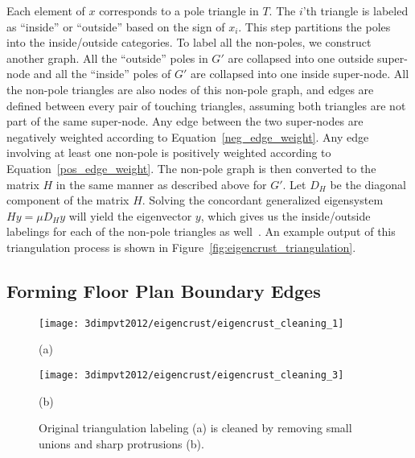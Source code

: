 \documentclass[12pt,onecolumn,oneside]{book}
\begin{document}
Each element of $x$ corresponds to a pole triangle in $T$.  The $i$'th triangle is labeled as ``inside'' or ``outside'' based on the sign of $x_i$.  This step partitions the poles into the inside/outside categories.  To label all the non-poles, we construct another graph.  All the ``outside'' poles in $G'$ are collapsed into one outside super-node and all the ``inside'' poles of $G'$ are collapsed into one inside super-node.  All the non-pole triangles are also nodes of this non-pole graph, and edges are defined between every pair of touching triangles, assuming both triangles are not part of the same super-node. Any edge between the two super-nodes are negatively weighted according to Equation~\ref{neg_edge_weight}.  Any edge involving at least one non-pole is positively weighted according to Equation~\ref{pos_edge_weight}.  The non-pole graph is then converted to the matrix $H$ in the same manner as described above for $G'$.  Let $D_H$ be the diagonal component of the matrix $H$.  Solving the concordant generalized eigensystem $H y = \mu D_H y$ will yield the eigenvector $y$, which gives us the inside/outside labelings for each of the non-pole triangles as well~\cite{EigencrustShewchuk}. An example output of this triangulation process is shown in Figure~\ref{fig:eigencrust_triangulation}.

\subsection{Forming Floor Plan Boundary Edges}
\label{ssec:eigencrust_boundary}

\begin{figure}[t]

\begin{minipage}[b]{0.49\linewidth}
  \centering
  \centerline{\texttt{[image: 3dimpvt2012/eigencrust/eigencrust\_cleaning\_1]}}
  \centerline{(a)}
\end{minipage}
\hfill
\begin{minipage}[b]{0.49\linewidth}
  \centering
  \centerline{\texttt{[image: 3dimpvt2012/eigencrust/eigencrust\_cleaning\_3]}}
  \centerline{(b)}
\end{minipage}

\caption[Post-processing floor plan triangulation.]{Original triangulation labeling (a) is cleaned by removing small unions and sharp protrusions (b).}
\label{fig:eigencrust_postprocessing}

\end{figure}
\end{document}
